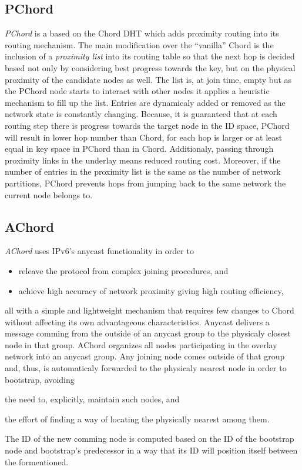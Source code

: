 \documentclass[a4paper,10pt]{article}
\begin{document}
\subsection{PChord}
\emph{PChord}\cite{hong_pchord_2005} is a based on the Chord DHT which adds proximity routing into its routing mechanism. The main modification over the ``vanilla'' Chord is the inclusion of a \emph{proximity list} into its routing table so that the next hop is decided based not only by considering best progress towards the key, but on the physical proximity of the candidate nodes as well. The list is, at join time, empty but as the PChord node starts to interact with other nodes it applies a heuristic mechanism to fill up the list. Entries are dynamicaly added or removed as the network state is constantly changing. Because, it is guaranteed that at each routing step there is progress towards the target node in the ID space, PChord will result in lower hop number than Chord, for each hop is larger or at least equal in key space in PChord than in Chord. Additionaly, passing through proximity links in the underlay means reduced routing cost. Moreover, if the number of entries in the proximity list is the same as the number of network partitions, PChord prevents hops from jumping back to the same network the current node belongs to.

\subsection{AChord}
\emph{AChord}\cite{dao_achord_2006} uses IPv6's anycast functionality in order to
\begin{itemize}
 \item releave the protocol from complex joining procedures, and
 \item achieve high accuracy of network proximity giving high routing efficiency,
\end{itemize}
all with a simple and lightweight mechanism that requires few changes to Chord without affecting its own advantageous characteristics. Anycast delivers a message comming from the outside of an anycast group to the physicaly closest node in that group. AChord organizes all nodes participating in the overlay network into an anycast group. Any joining node comes outside of that group and, thus, is automaticaly forwarded to the physicaly nearest node in order to bootstrap, avoiding
\begin{inparaenum}
  \item the need to, explicitly, maintain such nodes, and
  \item the effort of finding a way of locating the physically nearest among them.
\end{inparaenum}
The ID of the new comming node is computed based on the ID of the bootstrap node and bootstrap's predecessor in a way that its ID will position itself between the formentioned.
\end{document}
